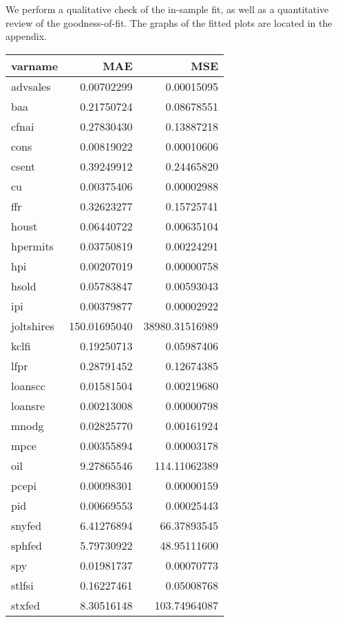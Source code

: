 \documentclass[11pt, letterpaper]{article}\usepackage[]{graphicx}\usepackage[]{color}
\begin{document}
We perform a qualitative check of the in-sample fit, as well as a quantitative review of the goodness-of-fit. The graphs of the fitted plots are located in the appendix.
\begin{table}[H]
\centering
\begingroup\footnotesize
\begin{tabular}{lrr}
  \hline
varname & MAE & MSE \\ 
  \hline
advsales & 0.00702299 & 0.00015095 \\ 
  baa & 0.21750724 & 0.08678551 \\ 
  cfnai & 0.27830430 & 0.13887218 \\ 
  cons & 0.00819022 & 0.00010606 \\ 
  csent & 0.39249912 & 0.24465820 \\ 
  cu & 0.00375406 & 0.00002988 \\ 
  ffr & 0.32623277 & 0.15725741 \\ 
  houst & 0.06440722 & 0.00635104 \\ 
  hpermits & 0.03750819 & 0.00224291 \\ 
  hpi & 0.00207019 & 0.00000758 \\ 
  hsold & 0.05783847 & 0.00593043 \\ 
  ipi & 0.00379877 & 0.00002922 \\ 
  joltshires & 150.01695040 & 38980.31516989 \\ 
  kclfi & 0.19250713 & 0.05987406 \\ 
  lfpr & 0.28791452 & 0.12674385 \\ 
  loanscc & 0.01581504 & 0.00219680 \\ 
  loansre & 0.00213008 & 0.00000798 \\ 
  mnodg & 0.02825770 & 0.00161924 \\ 
  mpce & 0.00355894 & 0.00003178 \\ 
  oil & 9.27865546 & 114.11062389 \\ 
  pcepi & 0.00098301 & 0.00000159 \\ 
  pid & 0.00669553 & 0.00025443 \\ 
  snyfed & 6.41276894 & 66.37893545 \\ 
  sphfed & 5.79730922 & 48.95111600 \\ 
  spy & 0.01981737 & 0.00070773 \\ 
  stlfsi & 0.16227461 & 0.05008768 \\ 
  stxfed & 8.30516148 & 103.74964087 \\ 

\end{tabular}
\end{table}
\end{document}

